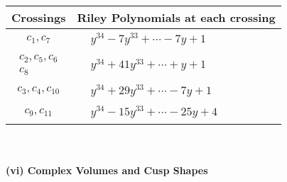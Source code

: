 \documentclass[1p]{elsarticle_modified}
\theoremstyle{definition}
\begin{document}
\begin{tabular}{m{50pt}|m{274pt}}
Crossings & \hspace{64pt}Riley Polynomials at each crossing \\
\hline $$\begin{aligned}c_{1},c_{7}\end{aligned}$$&$\begin{aligned}
&y^{34}-7 y^{33}+\cdots-7 y+1
\end{aligned}$\\
\hline $$\begin{aligned}c_{2},c_{5},c_{6}\\c_{8}\end{aligned}$$&$\begin{aligned}
&y^{34}+41 y^{33}+\cdots+y+1
\end{aligned}$\\
\hline $$\begin{aligned}c_{3},c_{4},c_{10}\end{aligned}$$&$\begin{aligned}
&y^{34}+29 y^{33}+\cdots-7 y+1
\end{aligned}$\\
\hline $$\begin{aligned}c_{9},c_{11}\end{aligned}$$&$\begin{aligned}
&y^{34}-15 y^{33}+\cdots-25 y+4
\end{aligned}$\\
\hline
\end{tabular}\\~\\
\newpage\flushleft \textbf{(vi) Complex Volumes and Cusp Shapes}
\end{document}
